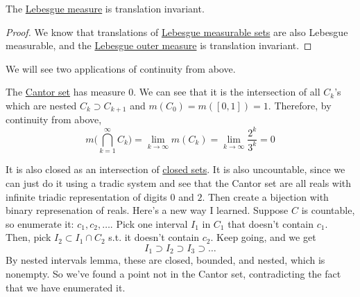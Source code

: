   \begin{lemma}
    \label{thm:translation-invariance-of-lebesgue-measure}
    The \hyperref[def:lebesgue-measure]{Lebesgue measure} is translation invariant. 
  \end{lemma}
  \begin{proof}
    We know that translations of \hyperref[def:lebesgue-measurable-set]{Lebesgue measurable sets} are also Lebesgue measurable, and the \hyperref[def:lebesgue-outer-measure]{Lebesgue outer measure} is translation invariant. 
  \end{proof}

  We will see two applications of continuity from above. 

  \begin{example}
    \label{ex:cantor-set-has-measure-0}
    The \hyperref[ex:cantor-set-is-measurable]{Cantor set} has measure $0$. We can see that it is the intersection of all $C_k$'s which are nested $C_k \supset C_{k+1}$ and $m(C_0) = m([0, 1]) = 1$. Therefore, by continuity from above, 
    \begin{equation}
      m \bigg( \bigcap_{k=1}^\infty C_k \bigg) = \lim_{k \to \infty} m(C_k) = \lim_{k \to \infty} \frac{2^k}{3^k} = 0 
    \end{equation}

    It is also closed as an intersection of \hyperref[pst-def:closed]{closed sets}. It is also uncountable, since we can just do it using a tradic system and see that the Cantor set are all reals with infinite triadic representation of digits $0$ and $2$. Then create a bijection with binary represenation of reals. Here's a new way I learned. Suppose $C$ is countable, so enumerate it: $c_1, c_2, \ldots$. Pick one interval $I_1$ in $C_1$ that doesn't contain $c_1$. Then, pick $I_2 \subset I_1 \cap C_2$ s.t. it doesn't contain $c_2$. Keep going, and we get 
    \begin{equation}
      I_1 \supset I_2 \supset I_3 \supset \ldots 
    \end{equation}
    By nested intervals lemma, these are closed, bounded, and nested, which is nonempty. So we've found a point not in the Cantor set, contradicting the fact that we have enumerated it. 
  \end{example}

